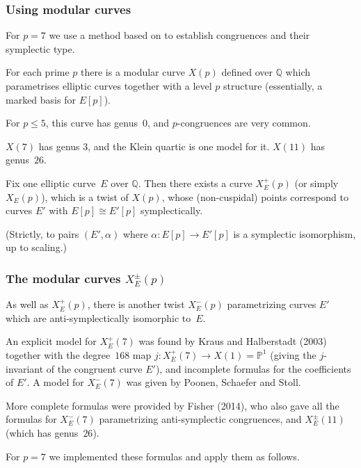 \documentclass[handout]{beamer}
\newcommand{\Q}{\mathbb Q}
\newcommand{\PP}{\mathbb P}
\newcommand{\high}[1]{\emph{\color{blue}{#1}}}
\begin{document}
\begin{frame}\frametitle{Using modular curves}

  For $p=7$ we use a method based on \high{modular curves} to
  establish congruences and their symplectic type.    \pause

 For each prime $p$ there is a modular curve $X(p)$ defined over $\Q$
 which parametrises elliptic curves together with a level $p$ structure
 (essentially, a marked basis for $E[p]$).    \pause

 For $p\le5$, this curve has genus~$0$, and $p$-congruences are very
 common.

 $X(7)$ has genus $3$, and the Klein quartic is one model for it.
 $X(11)$ has genus~$26$.

    \pause
  \medskip
  Fix one elliptic curve~$E$ over $\Q$.  Then there exists a curve
  $X_E^+(p)$ (or simply $X_E(p)$), which is a twist of $X(p)$, whose
  (non-cuspidal) points correspond to curves $E'$ with $E[p]\cong
  E'[p]$ symplectically.

  {\small(Strictly, to pairs $(E',\alpha)$ where $\alpha:E[p]\to E'[p]$ is a
  symplectic isomorphism, up to scaling.)}
\end{frame}

\begin{frame}\frametitle{The modular curves $X_E^{\pm}(p)$}
As well as $X_E^+(p)$, there is another twist $X_E^-(p)$ parametrizing
curves $E'$ which are anti-symplectically isomorphic to~$E$.  \pause
  \medskip

An explicit model for $X_E^+(7)$ was found by Kraus and Halberstadt
(2003) together with the degree~$168$ map $j:X_E^+(7)\to X(1)=\PP^1$
(giving the $j$-invariant of the congruent curve $E'$), and incomplete
formulas for the coefficients of $E'$. A model for $X_E^-(7)$ was
given by Poonen, Schaefer and Stoll.

    \pause
  \medskip
More complete formulas were provided by Fisher (2014), who also gave
all the formulas for $X_E^-(7)$ parametrizing anti-symplectic
congruences, and $X_E^{\pm}(11)$ (which has genus~$26$).

    \pause
  \medskip
For $p=7$ we implemented these formulas and apply them as follows.
\end{frame}
\end{document}
